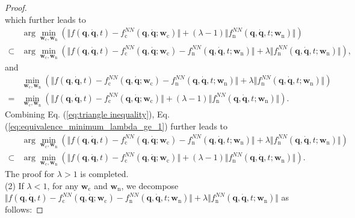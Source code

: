 \documentclass[aps,pre,reprint,superscriptaddress,nofootinbib,amsmath,amssymb]{revtex4-2}
\newcommand{\mat}[1]{\mathbf{#1}}
\newcommand{\q}{\mat{q}}
\newcommand{\qd}{\dot{\mat{q}}}
\begin{document}
\begin{proof}
\begin{equation*}
	\end{equation*}
	which further leads to
	\begin{align*}
		&\arg\min_{\boldsymbol{w}_{\mathrm{c}},\boldsymbol{w}_{\mathrm{n}}}\left( \Vert f(\q,\qd, t)-f_{\mathrm{c}}^{NN}(\q,\qd;\boldsymbol{w}_{\mathrm{c}})\Vert +(\lambda-1) \Vert f_{\mathrm{n}}^{NN}(\q,\qd,t;\boldsymbol{w}_{\mathrm{n}})\Vert\right)
		\\
		\subset &\arg\min_{\boldsymbol{w}_{\mathrm{c}},\boldsymbol{w}_{\mathrm{n}}}\left( \Vert f(\q,\qd,t)-f_{\mathrm{c}}^{NN}(\q,\qd;\boldsymbol{w}_{\mathrm{c}})-f_{\mathrm{n}}^{NN}(\q,\qd,t;\boldsymbol{w}_{\mathrm{n}})\Vert +\lambda \Vert f_{\mathrm{n}}^{NN}(\q,\qd,t;\boldsymbol{w}_{\mathrm{n}})\Vert\right),
	\end{align*}
	and
	\begin{align}
		\nonumber
		&\min_{\boldsymbol{w}_{\mathrm{c}},\boldsymbol{w}_{\mathrm{n}}}\left( \Vert f(\q,\qd,t)-f_{\mathrm{c}}^{NN}(\q,\qd;\boldsymbol{w}_{\mathrm{c}})-f_{\mathrm{n}}^{NN}(\q,\qd,t;\boldsymbol{w}_{\mathrm{n}})\Vert +\lambda \Vert f_{\mathrm{n}}^{NN}(\q,\qd,t;\boldsymbol{w}_{\mathrm{n}})\Vert\right)
		\\
		\label{eq:equivalence_minimum_lambda_ge_1}
		= &\min_{\boldsymbol{w}_{\mathrm{c}},\boldsymbol{w}_{\mathrm{n}}}\left( \Vert f(\q,\qd,t)-f_{\mathrm{c}}^{NN}(\q,\qd;\boldsymbol{w}_{\mathrm{c}})\Vert +(\lambda-1) \Vert f_{\mathrm{n}}^{NN}(\q,\qd,t;\boldsymbol{w}_{\mathrm{n}})\Vert\right).
	\end{align}
	Combining Eq. (\ref{eq:triangle inequality}), Eq. (\ref{eq:equivalence_minimum_lambda_ge_1}) further leads to 
	\begin{align*}
		&\arg\min_{\boldsymbol{w}_{\mathrm{c}},\boldsymbol{w}_{\mathrm{n}}}\left( \Vert f(\q,\qd,t)-f_{\mathrm{c}}^{NN}(\q,\qd;\boldsymbol{w}_{\mathrm{c}})-f_{\mathrm{n}}^{NN}(\q,\qd,t;\boldsymbol{w}_{\mathrm{n}})\Vert +\lambda \Vert f_{\mathrm{n}}^{NN}(\q,\qd,t;\boldsymbol{w}_{\mathrm{n}})\Vert\right)
		\\
		\subset &\arg\min_{\boldsymbol{w}_{\mathrm{c}},\boldsymbol{w}_{\mathrm{n}}}\left( \Vert f(\q,\qd,t)-f_{\mathrm{c}}^{NN}(\q,\qd;\boldsymbol{w}_{\mathrm{c}})\Vert +(\lambda-1) \Vert f_{\mathrm{n}}^{NN}(\q,\qd,t;\boldsymbol{w}_{\mathrm{n}})\Vert\right).
	\end{align*}
	The proof for $\lambda>1$ is completed.
	\\
	(2) If $\lambda<1$, for any $\boldsymbol{w}_{\mathrm{c}}$ and $\boldsymbol{w}_{\mathrm{n}}$, we decompose $\Vert f(\q,\qd,t)-f_{\mathrm{c}}^{NN}(\q,\qd;\boldsymbol{w}_{\mathrm{c}})-f_{\mathrm{n}}^{NN}(\q,\qd,t;\boldsymbol{w}_{\mathrm{n}})\Vert +\lambda \Vert f_{\mathrm{n}}^{NN}(\q,\qd,t;\boldsymbol{w}_{\mathrm{n}})\Vert$ as follows:

\end{proof}
\end{document}
